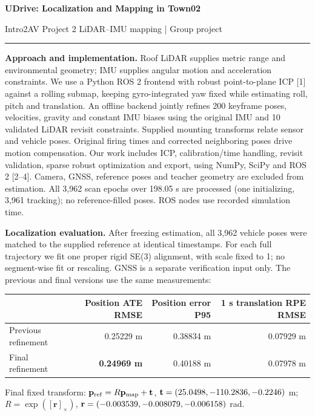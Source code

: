 \documentclass[10pt,a4paper]{article}
\begin{document}
{\LARGE\bfseries UDrive: Localization and Mapping in Town02}\par
{\small Intro2AV Project 2 \hfill LiDAR--IMU mapping | Group project}
\vspace{3pt}\hrule\vspace{3pt}

\textbf{Approach and implementation.}
Roof LiDAR supplies metric range and environmental geometry; IMU supplies angular motion and acceleration constraints. We use a Python ROS 2 frontend with robust point-to-plane ICP [1] against a rolling submap, keeping gyro-integrated yaw fixed while estimating roll, pitch and translation. An offline backend jointly refines 200 keyframe poses, velocities, gravity and constant IMU biases using the original IMU and 10 validated LiDAR revisit constraints. Supplied mounting transforms relate sensor and vehicle poses. Original firing times and corrected neighboring poses drive motion compensation. Our work includes ICP, calibration/time handling, revisit validation, sparse robust optimization and export, using NumPy, SciPy and ROS 2 [2--4]. Camera, GNSS, reference poses and teacher geometry are excluded from estimation. All 3,962 scan epochs over 198.05 s are processed (one initializing, 3,961 tracking); no reference-filled poses. ROS nodes use recorded simulation time.

\textbf{Localization evaluation.}
After freezing estimation, all 3,962 vehicle poses were matched to the supplied reference at identical timestamps. For each full trajectory we fit one proper rigid SE(3) alignment, with scale fixed to 1; no segment-wise fit or rescaling. GNSS is a separate verification input only. The previous and final versions use the same measurements:

\begin{center}
\begin{tabular}{lrrr}
\toprule
 & Position ATE RMSE & Position error P95 & 1 s translation RPE RMSE\\
\midrule
Previous refinement & 0.25229 m & 0.38834 m & 0.07929 m\\
Final refinement & \textbf{0.24969 m} & 0.40188 m & 0.07978 m\\
\bottomrule
\end{tabular}
\end{center}
\vspace{-5pt}
{\small Final fixed transform: $\mathbf p_{\rm ref}=R\mathbf p_{\rm map}+\mathbf t$,
$\mathbf t=(25.0498, -110.2836, -0.2246)$ m;
$R=\exp([\mathbf r]_\times)$, $\mathbf r=(-0.003539, -0.008079, -0.006158)$ rad.}
\end{document}
